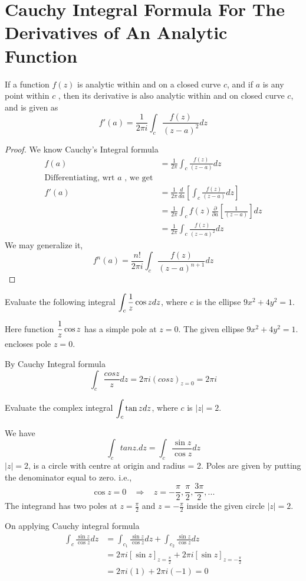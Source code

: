 \section{Cauchy Integral Formula For The Derivatives of An Analytic Function}
\begin{theorem}
If a function $f(z)$ is analytic within and on a closed curve $c$, and if $a$ is any point within $c$ , then its derivative is also analytic within and on closed curve $c$, and is given as 
\[f'(a) = \frac{1}{2\pi i}\int_{c} \frac{f(z)}{(z-a)^2} dz\]
\end{theorem}
\begin{proof}
We know Cauchy's Integral formula
\begin{align*}
	f(a) &= \frac{1}{2\pi}\int_{c} \frac{f(z)}{(z-a)} dz \\
\text{Differentiating, wrt $a$ , we get} \\
	f'(a) &= \frac{1}{2\pi}\frac{d}{da}\left[\int_{c} \frac{f(z)}{(z-a)} dz \right]\\
	      &= \frac{1}{2\pi} \int_{c} f(z) \frac{\partial}{\partial a}\left[\frac{1}{(z-a)} \right]dz\\
	      &= \frac{1}{2\pi}\int_{c} \frac{f(z)}{(z-a)^2} dz
\end{align*}
We may generalize it,
\[f^n(a) = \frac{n!}{2\pi i}\int_{c} \frac{f(z)}{(z-a)^{n+1}} dz\]
\end{proof}
\begin{example}
Evaluate the following integral $\displaystyle \int_{c}\frac{1}{z}\cos z dz$, where $c$ is the ellipse $9x^{2}+4y^{2}=1$.
\end{example} 
\begin{solution}
Here function $\displaystyle \frac{1}{z}\cos z$ has a simple pole at $z=0$. The given ellipse $9x^{2}+4y^{2}=1.$ encloses pole $z=0$.

\noindent
By Cauchy Integral formula
\[\int_{c}\frac{cosz}{z}dz=2\pi i(cosz)_{z=0}=2\pi i\]
\end{solution} 
\begin{example}
Evaluate the complex integral $\displaystyle \int_{c} \tan z dz$, where $c$ is $|z|=2$.
\end{example} 
\begin{solution}
We have
\[\int_{c}tanz.dz=\int_{c}\frac{\sin z}{\cos z} dz\]
$|z|=2$, is a circle with centre at origin and radius = 2. Poles are given by putting the denominator equal to zero. i.e.,
\[\cos z=0 ~~~~\Rightarrow ~~~~ z=-\frac{\pi}{2},\frac{\pi}{2},\frac{3\pi}{2},...\]
The integrand has two poles at $z=\frac{\pi}{2}$ and $z=-\frac{\pi}{2}$ inside the given circle $|z|=2$.

\noindent
On applying Cauchy integral formula 
\begin{align*}
	\int_{c}\frac{\sin z}{\cos z}dz &= \int_{c_1}\frac{\sin z}{\cos z}dz + \int_{c_2} \frac{\sin z}{\cos z}dz \\
	&=2\pi i[\sin z]_{z=\frac{\pi}{2}} + 2 \pi i[\sin z]_{z=-\frac{\pi}{2}} \\
	&=2\pi i(1)+2\pi i(-1)=0
\end{align*}
\end{solution} 
